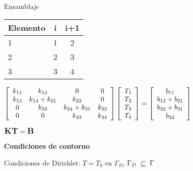 \documentclass[12pt]{report}
\begin{document}
        Ensamblaje

        \begin{table}[!th]
            \centering
            \begin{tabular}{|l|c|c|}
            \hline
            \textbf{Elemento} & \textbf{i} & \textbf{i+1} \\
            \hline
            1 & 1 & 2 \\
            \hline
            2 & 2 & 3 \\
            \hline
            3 & 3 & 4 \\
            \hline
            \end{tabular}
        \end{table}
        
        \begin{center}
            $\displaystyle \left[ \begin{array}{c c c c}  
                k_{1 1} & k_{1 2} & 0 & 0 \\
                k_{1 3} & k_{1 4} + k_{2 1} & k_{2 2} & 0 \\
                0 & k_{2 3} & k_{2 4} + k_{3 1} & k_{3 2} \\
                0 & 0 & k_{3 3} & k_{3 4}
            \end{array}\right] \left[ \begin{array}{c}
                T_1 \\
                T_2 \\
                T_3 \\
                T_4 \\
            \end{array} \right] = \left[\begin{array}{c}
                b_{1 1} \\
                b_{1 2} + b_{2 1} \\
                b_{2 2} + b_{3 1} \\
                b_{3 2}
            \end{array}\right]$
        \end{center}

        $\displaystyle \large \textbf{K} \textbf{T} = \textbf{B}$

        \textbf{Condiciones de contorno}
        
        Condiciones de Dirichlet: $T = T_0$ en $\Gamma_D$, $\Gamma_D \hspace{0.2cm} \underline{\subset} \hspace{0.2cm} \Gamma$ 
\end{document}
